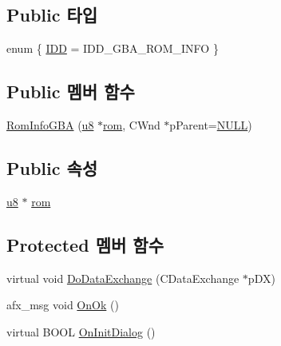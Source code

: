 \subsection*{Public 타입}
\begin{DoxyCompactItemize}
\item 
enum \{ \mbox{\hyperlink{class_rom_info_g_b_a_a6425fe061557249d4e064c130d9768f8a10060dd49f055afb737390d2a0f0c93c}{I\+DD}} = I\+D\+D\+\_\+\+G\+B\+A\+\_\+\+R\+O\+M\+\_\+\+I\+N\+FO
 \}
\end{DoxyCompactItemize}
\subsection*{Public 멤버 함수}
\begin{DoxyCompactItemize}
\item 
\mbox{\hyperlink{class_rom_info_g_b_a_a60647da88fd06c7e804844aa1836415c}{Rom\+Info\+G\+BA}} (\mbox{\hyperlink{_system_8h_aed742c436da53c1080638ce6ef7d13de}{u8}} $\ast$\mbox{\hyperlink{class_rom_info_g_b_a_af44895da29e3b91d95cd31f3acb0eb60}{rom}}, C\+Wnd $\ast$p\+Parent=\mbox{\hyperlink{_system_8h_a070d2ce7b6bb7e5c05602aa8c308d0c4}{N\+U\+LL}})
\end{DoxyCompactItemize}
\subsection*{Public 속성}
\begin{DoxyCompactItemize}
\item 
\mbox{\hyperlink{_system_8h_aed742c436da53c1080638ce6ef7d13de}{u8}} $\ast$ \mbox{\hyperlink{class_rom_info_g_b_a_af44895da29e3b91d95cd31f3acb0eb60}{rom}}
\end{DoxyCompactItemize}
\subsection*{Protected 멤버 함수}
\begin{DoxyCompactItemize}
\item 
virtual void \mbox{\hyperlink{class_rom_info_g_b_a_a19a2f111cce09e494d2877767ad615dd}{Do\+Data\+Exchange}} (C\+Data\+Exchange $\ast$p\+DX)
\item 
afx\+\_\+msg void \mbox{\hyperlink{class_rom_info_g_b_a_ad01e4389fa3c966b785976bbcb2a430b}{On\+Ok}} ()
\item 
virtual B\+O\+OL \mbox{\hyperlink{class_rom_info_g_b_a_aa449f0a97d7515dd30ef8b5dabb343a3}{On\+Init\+Dialog}} ()
\end{DoxyCompactItemize}


